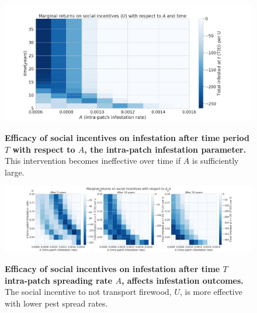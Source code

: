 \begin{figure}[!h]
\includegraphics[width=\textwidth]{chapter_2/A_v_time.png}
\caption{\textbf{Efficacy of social incentives on infestation after time period $T$ with respect to $A$, the intra-patch infestation parameter.} This intervention becomes ineffective over time if $A$ is sufficiently large.}
\protect \label{A_v_time}
\end{figure}




\begin{figure}[!h]
\includegraphics[width = \textwidth]{chapter_2/A_v_ct_v_d_marginal_gain.png}
\caption{\textbf{Efficacy of social incentives on infestation after time $T$ intra-patch spreading rate $A$, affects infestation outcomes.} The social incentive to not transport firewood, $U$, is more effective with lower pest spread rates.}
\protect \label{A_v_d}
\end{figure}


